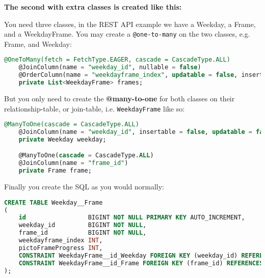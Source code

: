 \textbf{The second with extra classes is created like this:}

You need three classes, in the REST API example we have a Weekday, a Frame, and a WeekdayFrame.
You may create a \texttt{@one-to-many} on the two classes, e.g. Frame, and Weekday:

\begin{lstlisting}[caption={One of the relations on the opposite side to create the \texttt{One-to-Many} to the relationship class.}, language=sql]
    @OneToMany(fetch = FetchType.EAGER, cascade = CascadeType.ALL)
    @JoinColumn(name = "weekday_id", nullable = false)
    @OrderColumn(name = "weekdayframe_index", updatable = false, insertable = false)
    private List<WeekdayFrame> frames;
\end{lstlisting}


But you only need to create the \textbf{@many-to-one} for both classes on their relationship-table, or join-table, i.e. \texttt{WeekdayFrame} like so:

\begin{lstlisting}[caption={The two relations needed on the relationship class in order to create the \texttt{Many-to-Many} relationship.}, language=sql]
    @ManyToOne(cascade = CascadeType.ALL)
    @JoinColumn(name = "weekday_id", insertable = false, updatable = false)
    private Weekday weekday;

    @ManyToOne(cascade = CascadeType.ALL)
    @JoinColumn(name = "frame_id")
    private Frame frame;
\end{lstlisting}


Finally you create the SQL as you would normally: 


\begin{lstlisting}[caption={The SQL needed for the relationship class to create the \texttt{Many-to-Many}.}, language=sql]
CREATE TABLE Weekday__Frame
(
    id                 BIGINT NOT NULL PRIMARY KEY AUTO_INCREMENT,
    weekday_id         BIGINT NOT NULL,
    frame_id           BIGINT NOT NULL,
    weekdayframe_index INT,
    pictoFrameProgress INT,
    CONSTRAINT WeekdayFrame__id_Weekday FOREIGN KEY (weekday_id) REFERENCES Weekday (id),
    CONSTRAINT WeekdayFrame__id_Frame FOREIGN KEY (frame_id) REFERENCES Frame (id)
);
\end{lstlisting}


